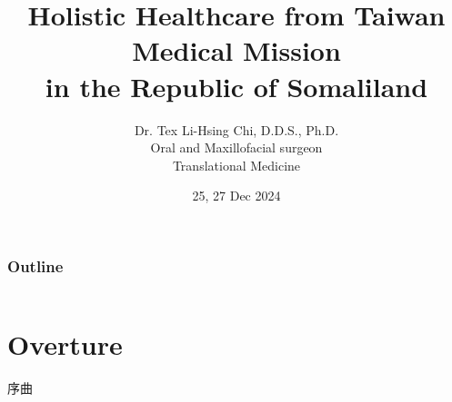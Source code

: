 \documentclass[aspectratio=169]{beamer}
\title{Holistic Healthcare from Taiwan Medical Mission \\ in the Republic of Somaliland}
\author{Dr. Tex Li-Hsing Chi, D.D.S., Ph.D. \\
        Oral and Maxillofacial surgeon \\
        Translational Medicine}
\institute{Taipei Medical University}
\date{25, 27 Dec 2024} %
\begin{document}


\begin{frame}
\titlepage
\end{frame}

\begin{frame}
\frametitle{Outline}

\begin{columns}
\tableofcontents



\end{columns}


\end{frame}


\section{Overture}

\begin{frame}{序曲}
    \begin{center}
        
    \end{center}
\end{frame}
\end{document}
